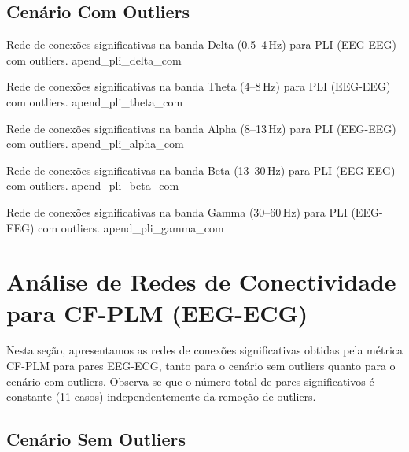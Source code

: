 \begin{apendicesenv}
\section{Cenário Com Outliers}

{Rede de conexões significativas na banda Delta (0.5--4\,Hz) para PLI (EEG-EEG) com outliers.}
{apend_pli_delta_com}

{Rede de conexões significativas na banda Theta (4--8\,Hz) para PLI (EEG-EEG) com outliers.}
{apend_pli_theta_com}

{Rede de conexões significativas na banda Alpha (8--13\,Hz) para PLI (EEG-EEG) com outliers.}
{apend_pli_alpha_com}

{Rede de conexões significativas na banda Beta (13--30\,Hz) para PLI (EEG-EEG) com outliers.}
{apend_pli_beta_com}

{Rede de conexões significativas na banda Gamma (30--60\,Hz) para PLI (EEG-EEG) com outliers.}
{apend_pli_gamma_com}


\chapter{Análise de Redes de Conectividade para CF-PLM (EEG-ECG)}
\label{apendice:cfplm_eeg_ecg}

Nesta seção, apresentamos as redes de conexões significativas obtidas pela métrica CF-PLM para pares EEG-ECG, tanto para o cenário sem outliers quanto para o cenário com outliers. Observa-se que o número total de pares significativos é constante (11 casos) independentemente da remoção de outliers.

\section{Cenário Sem Outliers}


\end{apendicesenv}
